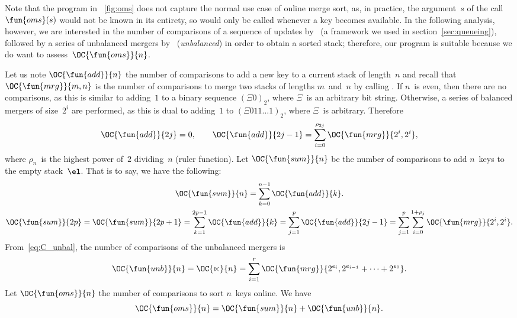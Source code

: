 Note that the program in \fig~\vref{fig:oms} does not capture the
normal use case of online merge sort, as, in practice, the
argument~\(s\) of the call \(\fun{oms}(s)\)
would not be known in its entirety, so
 would only be called whenever a key
becomes available. In the following analysis, however, we are
interested in the number of comparisons of a sequence of updates
by~ (a framework we used in
section~\ref{sec:queueing}), followed by a series of unbalanced
mergers by~ (\emph{unbalanced}) in
order to obtain a sorted stack; therefore, our program is suitable
because we do want to assess~\(\OC{\fun{oms}}{n}\).

Let us note \(\OC{\fun{add}}{n}\) the
number of comparisons to add a new key to a current stack of
length~\(n\) and recall that
\(\OC{\fun{mrg}}{m,n}\) is the number
of comparisons to merge two stacks of lengths \(m\)~and~\(n\) by
calling . If \(n\)~is even, then
there are no comparisons, as this is similar to adding~\(1\) to a
binary sequence \((\Xi{0})_2\), where \(\Xi\)~is an arbitrary bit
string. Otherwise, a series of balanced mergers of size~\(2^i\) are
performed, as this is dual to adding~\(1\) to \((\Xi{011}\ldots
1)_2\), where \(\Xi\)~is arbitrary. Therefore
\begin{equation*}
\OC{\fun{add}}{2j} = 0,\qquad
\OC{\fun{add}}{2j-1} = \sum_{i=0}^{\rho_{2j}}{\OC{\fun{mrg}}{2^i,2^i}},
\end{equation*}
where \(\rho_n\)~is the highest power of~\(2\) dividing~\(n\) (ruler
function).  Let
\(\OC{\fun{sum}}{n}\) be the number of
comparisons to add \(n\)~keys to the empty stack~\(\el\). That is to
say, we have the following:
\begin{gather}
\abovedisplayskip=0pt
\belowdisplayskip=0pt
\OC{\fun{sum}}{n} = \sum_{k=0}^{n-1}{\OC{\fun{add}}{k}}.\notag\\[0mm]
\OC{\fun{sum}}{2p} = \OC{\fun{sum}}{2p+1}
= \sum_{k=1}^{2p-1}{\OC{\fun{add}}{k}}
= \sum_{j=1}^{p}{\OC{\fun{add}}{2j-1}}
= \sum_{j=1}^{p}\sum_{i=0}^{1+\rho_{j}}{\OC{\fun{mrg}}{2^i,2^i}}.
\label{eq:sum_2p}
\end{gather}
From~\eqref{eq:C_unbal}, the number of comparisons of the
unbalanced mergers is
\begin{equation}
\abovedisplayskip=0pt
\belowdisplayskip=0pt
\OC{\fun{unb}}{n}
= \OC{\ltimes}{n}
= \sum_{i=1}^{r}{\OC{\fun{mrg}}{2^{e_i},2^{e_{i-1}}+\dots+2^{e_0}}}.
\index{unb@$\OC{\fun{unb}}{n}$}
\label{eq:cost_unb}
\end{equation}
Let \(\OC{\fun{oms}}{n}\) the number of
comparisons to sort \(n\)~keys online. We have
\begin{equation}
\OC{\fun{oms}}{n} = \OC{\fun{sum}}{n} + \OC{\fun{unb}}{n}.
\index{sum@$\OC{\fun{sum}}{n}$}
\label{eq:ocost_online}
\end{equation}

